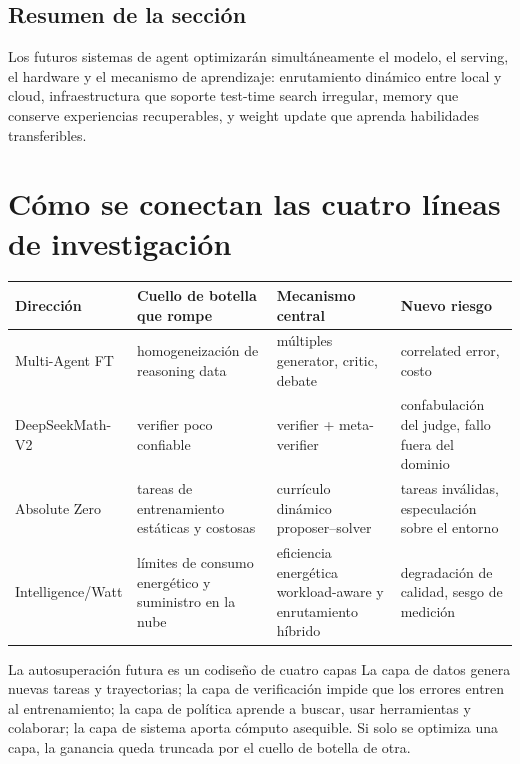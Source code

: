 \documentclass[a4paper]{article}
\begin{document}
\subsection{Resumen de la sección}

Los futuros sistemas de agent optimizarán simultáneamente el modelo, el serving, el hardware y el mecanismo de aprendizaje: enrutamiento dinámico entre local y cloud, infraestructura que soporte test-time search irregular, memory que conserve experiencias recuperables, y weight update que aprenda habilidades transferibles.

\section{Cómo se conectan las cuatro líneas de investigación}

\begin{table}[H]
\centering
\small
\begin{tabular}{>{\raggedright\arraybackslash}p{3cm}>{\raggedright\arraybackslash}p{3.4cm}>{\raggedright\arraybackslash}p{3.7cm}>{\raggedright\arraybackslash}p{3.4cm}}
\toprule
\textbf{Dirección} & \textbf{Cuello de botella que rompe} & \textbf{Mecanismo central} & \textbf{Nuevo riesgo} \\
\midrule
Multi-Agent FT & homogeneización de reasoning data & múltiples generator, critic, debate & correlated error, costo \\
DeepSeekMath-V2 & verifier poco confiable & verifier + meta-verifier & confabulación del judge, fallo fuera del dominio \\
Absolute Zero & tareas de entrenamiento estáticas y costosas & currículo dinámico proposer--solver & tareas inválidas, especulación sobre el entorno \\
Intelligence/Watt & límites de consumo energético y suministro en la nube & eficiencia energética workload-aware y enrutamiento híbrido & degradación de calidad, sesgo de medición \\
\bottomrule
\end{tabular}
\end{table}

\begin{importantbox}{La autosuperación futura es un codiseño de cuatro capas}
La capa de datos genera nuevas tareas y trayectorias; la capa de verificación impide que los errores entren al entrenamiento; la capa de política aprende a buscar, usar herramientas y colaborar; la capa de sistema aporta cómputo asequible. Si solo se optimiza una capa, la ganancia queda truncada por el cuello de botella de otra.
\end{importantbox}
\end{document}
